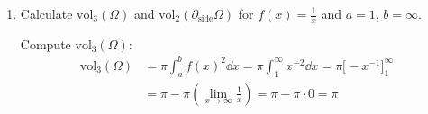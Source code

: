 \documentclass[12pt]{article}
\begin{document}
\begin{enumerate}
    The Jacobian is:
    \begin{align*}
        J\Phi =
        \begin{pmatrix}
            1 & 0 \\
            f'(x)\cos\theta & -f(x)\sin\theta \\
            f'(x)\sin\theta & f(x)\cos\theta 
        \end{pmatrix}
    \end{align*}

    The Gram determinant is
    \begin{align*}
        \sqrt{\det(J\Phi^T J\Phi)} &= 
        \sqrt{\det
        \begin{pmatrix}
            1 + f'(x)^2\cos^2\theta + f'(x)^2\sin^2\theta & 0 \\
            0 & f(x)^2\sin^2\theta + f(x)^2\cos^2\theta
        \end{pmatrix}
        } \\
        &= \sqrt{\det
        \begin{pmatrix}
            f'(x)^2 + 1 & 0 \\
            0 & f(x)^2
        \end{pmatrix}
        } =
        \sqrt{f(x)^2(f'(x)^2 + 1)} \\
        &= f(x) \sqrt{1 + f'(x)^2}
    \end{align*}

    So we can compute the 2-dimensional volume as follows:
    \begin{align*}
        \mathrm{vol}_2(\partial_{\text{side}}\Omega) &= \int_{a}^{b} \int_{0}^{2\pi} f(x) \sqrt{1 + f'(x)^2} \dd \theta \dd x = \int_{a}^{b} f(x) \sqrt{1 + f'(x)^2} \int_{0}^{2\pi} \dd \theta \dd x \\
        &= 2 \pi \int_{a}^{b} f(x) \sqrt{1 + f'(x)^2} \dd x
    \end{align*}

    which is what we wanted to show.

    \item Calculate $\mathrm{vol}_3(\Omega)$ and $\mathrm{vol}_2(\partial_{\text{side}}\Omega)$ for $f(x) = \frac{1}{x}$ and $a = 1$, $b = \infty$.
    
    Compute $\mathrm{vol}_3(\Omega)$:
    \begin{align*}
        \mathrm{vol}_3(\Omega) &= \pi \int_{a}^{b} f(x)^2 \dd x = \pi \int_{1}^{\infty} x^{-2} \dd x = \pi \big[ -x^{-1} \big]_{1}^{\infty} \\
        &= \pi -\pi \left(\lim_{x \rightarrow \infty} \frac{1}{x}\right) = \pi - \pi \cdot 0 = \pi
    \end{align*}


\end{enumerate}
\end{document}
